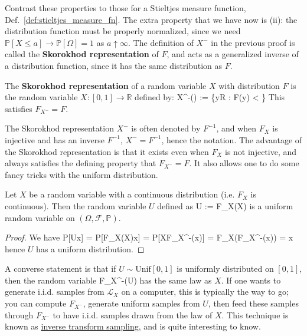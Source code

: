 Contrast these properties to those for a Stieltjes measure function, Def.~\ref{def:stieltjes_measure_fn}. The extra property that we have now is (ii): the distribution function must be properly normalized, since we need $\mathbb P[X\leq a]\rightarrow \mathbb P[\Omega] = 1$ as $a\uparrow\infty$. The definition of $X^-$ in the previous proof is called the \textbf{Skorokhod representation} of $F$, and acts as a generalized inverse of a distribution function, since it has the same distribution as $F$. 

\begin{definition}
	The \textbf{Skorokhod representation} of a random variable $X$ with distribution $F$ is the random variable $X : [0, 1]\rightarrow \mathbb R$ defined by:
	\eq
		X^-(\omega) := \sup\{y\in\mathbb R : F(y) < \omega\}
	\qe
	This satisfies $F_{X^-} = F$. 
\end{definition}

The Skorokhod representation $X^-$ is often denoted by $F^{-1}$, and when $F_X$ is injective and has an inverse $F^{-1}$, $X^- = F^{-1}$, hence the notation. The advantage of the Skorokhod representation is that it exists even when $F_X$ is not injective, and always satisfies the defining property that $F_{X^-} = F$. It also allows one to do some fancy tricks with the uniform distribution.

\begin{theorem}
	Let $X$ be a random variable with a continuous distribution (i.e. $F_X$ is continuous). Then the random variable $U$ defined as
	\eq
		U := F_X(X)
	\qe
	is a uniform random variable on $(\Omega, \mathcal F, \mathbb P)$. 
\end{theorem}
\begin{proof}
	We have
	\eq
		\mathbb P[U\leq x] = \mathbb P[F_X(X)\leq x] = \mathbb P[X\leq F_{X^-}(x)] = F_X(F_{X^-}(x)) = x
	\qe	
	hence $U$ has a uniform distribution.
\end{proof}

A converse statement is that if $U\sim \mathrm{Unif}[0, 1]$ is uniformly distributed on $[0, 1]$, then the random variable
\eq
	F_{X^-}(U)
\qe
has the same law as $X$. If one wants to generate i.i.d. samples from $\mathcal L_X$ on a computer, this is typically the way to go; you can compute $F_{X^-}$, generate uniform samples from $U$, then feed these samples through $F_{X^-}$ to have i.i.d. samples drawn from the law of $X$. This technique is known as \href{https://en.wikipedia.org/wiki/Inverse_transform_sampling}{inverse transform sampling}, and is quite interesting to know. 

